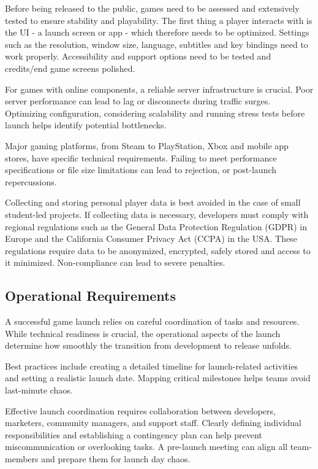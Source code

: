 Before being released to the public, games need to be assessed and extensively tested to ensure stability and playability. The first thing a player interacts with is the UI - a launch screen or app - which therefore needs to be optimized. Settings such as the resolution, window size, language, subtitles and key bindings need to work properly. Accessibility and support options need to be tested and credits/end game screens polished.\cite{silva_guide-to-release}

For games with online components, a reliable server infrastructure is crucial. Poor server performance can lead to lag or disconnects during traffic surges. Optimizing configuration, considering scalability and running stress tests before launch helps identify potential bottlenecks.\cite{sentika_how-to-optimize}

Major gaming platforms, from Steam to PlayStation, Xbox and mobile app stores, have specific technical requirements. Failing to meet performance specifications or file size limitations can lead to rejection, or post-launch repercussions.\cite{apple-ios-apps}

Collecting and storing personal player data is best avoided in the case of small student-led projects. If collecting data is necessary, developers must comply with regional regulations such as the General Data Protection Regulation (GDPR)\cite{eu_gdpr} in Europe and the California Consumer Privacy Act (CCPA)\cite{doj_ccpa} in the USA. These regulations require data to be anonymized, encrypted, safely stored and access to it minimized. Non-compliance can lead to severe penalties.\cite{silva_guide-to-release}

\subsection{Operational Requirements}
A successful game launch relies on careful coordination of tasks and resources. While technical readiness is crucial, the operational aspects of the launch determine how smoothly the transition from development to release unfolds.

Best practices include creating a detailed timeline for launch-related activities and setting a realistic launch date. Mapping critical milestones helps teams avoid last-minute chaos.\cite{edgegap_pre-launch-list}

Effective launch coordination requires collaboration between developers, marketers, community managers, and support staff. Clearly defining individual responsibilities and establishing a contingency plan can help prevent miscommunication or overlooking tasks. A pre-launch meeting can align all team-members and prepare them for launch day chaos.\cite{palmer_planning-launch, edgegap_pre-launch-list}


